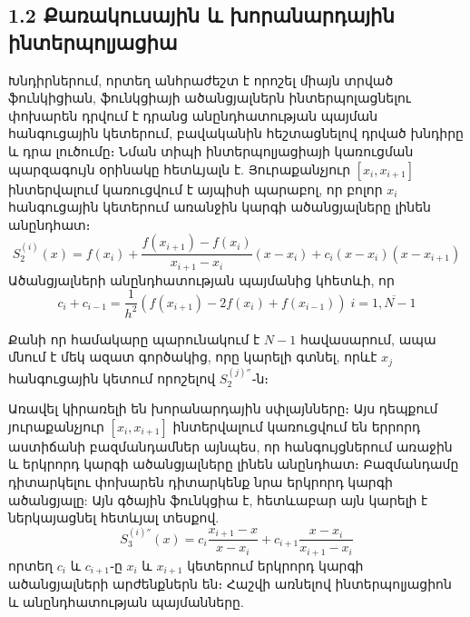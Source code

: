 \documentclass[fleqn, bachelor,subf,12pt,notitlepage]{article}
\begin{document}
\subsection*{1.2 Քառակուսային և խորանարդային ինտերպոլյացիա}
Խնդիրներում, որտեղ անհրաժեշտ է որոշել միայն տրված ֆունկիցիան, ֆունկցիայի ածանցյալներն ինտերպոլացնելու փոխարեն դրվում է դրանց անընդհատության պայման հանգուցային կետերում,  բավականին հեշտացնելով դրված խնդիրը և դրա լուծումը։
Նման տիպի ինտերպոլյացիայի կառուցման պարզագույն օրինակը հետևյալն է.
Յուրաքանչյուր $\left[x_{i}, x_{i+1}\right]$ ինտերվալում կառուցվում է այպիսի պարաբոլ, որ բոլոր $x_{i}$ հանգուցային կետերում առանջին կարգի ածանցյալները լինեն անընդհատ։
\begin{equation}
S_{2}^{(i)}(x)=f(x_{i})+\dfrac{f(x_{i+1})-f(x_{i})}{x_{i+1}-x_{i}}\left(x-x_{i}\right)+c_{i}\left(x-x_{i}\right)\left(x-x_{i+1}\right)
\end{equation}
Ածանցյալների անընդհատության պայմանից կհետևի, որ
\begin{equation}
c_{i}+c_{i-1}=\dfrac{1}{h^{2}}\left(f(x_{i+1})-2f(x_{i})+f(x_{i-1})\right) \; i=\overline{1, N-1}
\end{equation}

Քանի որ համակարը պարունակում է $N-1$ հավասարում, ապա մնում է մեկ ազատ գործակից, որը կարելի գտնել, որևէ $x_{j}$ հանգուցային կետում որոշելով $S_{2}^{(j)''}$֊ն։


Առավել կիրառելի են խորանարդային սփլայնները։ Այս դեպքում յուրաքանչյուր $\left[x_{i}, x_{i+1}\right]$ ինտերվալում կառուցվում են երրորդ աստիճանի բազմանդամներ այնպես, որ հանգույցներում առաջին և երկրորդ կարգի ածանցյալները լինեն անընդհատ։ 
Բազմանդամը դիտարկելու փոխարեն դիտարկենք նրա երկրորդ կարգի ածանցյալը: Այն գծային ֆունկցիա է, հետևաբար այն կարելի է ներկայացնել հետևյալ տեսքով.
\begin{equation}
S^{(i)''}_3(x)=c_{i}\dfrac{x_{i+1}-x}{x-x_{i}}+c_{i+1}\dfrac{x-x_{i}}{x_{i+1}-x_{i}}
\end{equation}
\noindent որտեղ $c_{i}$ և $c_{i+1}$֊ը $x_{i}$ և $x_{i+1}$ կետերում երկրորդ կարգի ածանցյալների արժենքներն են։ 
\noindent Հաշվի առնելով ինտերպոլյացիոն և անընդհատության պայմանները.
\end{document}
